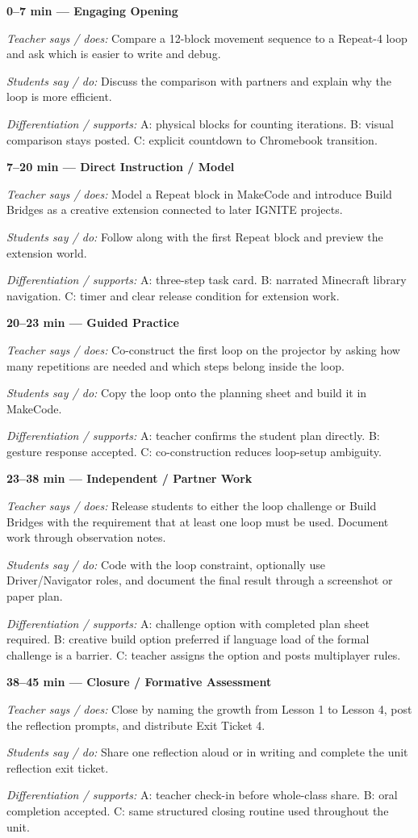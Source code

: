 \documentclass[12pt]{article}
\newcommand{\lessonphase}[5]{%
\noindent\textbf{\color{brickRed}#1 --- #2}\par
\textit{Teacher says / does:} #3\par
\textit{Students say / do:} #4\par
\textit{Differentiation / supports:} #5\par\medskip
}
\begin{document}
\begin{designbox}
\vspace{-0.2cm}
\lessonphase{0--7 min}{Engaging Opening}
{Compare a 12-block movement sequence to a Repeat-4 loop and ask which is easier to write and debug.}
{Discuss the comparison with partners and explain why the loop is more efficient.}
{A: physical blocks for counting iterations. B: visual comparison stays posted. C: explicit countdown to Chromebook transition.}

\vspace{-0.2cm}
\lessonphase{7--20 min}{Direct Instruction / Model}
{Model a Repeat block in MakeCode and introduce Build Bridges as a creative extension connected to later IGNITE projects.}
{Follow along with the first Repeat block and preview the extension world.}
{A: three-step task card. B: narrated Minecraft library navigation. C: timer and clear release condition for extension work.}

\vspace{-0.2cm}
\lessonphase{20--23 min}{Guided Practice}
{Co-construct the first loop on the projector by asking how many repetitions are needed and which steps belong inside the loop.}
{Copy the loop onto the planning sheet and build it in MakeCode.}
{A: teacher confirms the student plan directly. B: gesture response accepted. C: co-construction reduces loop-setup ambiguity.}

\vspace{-0.2cm}
\lessonphase{23--38 min}{Independent / Partner Work}
{Release students to either the loop challenge or Build Bridges with the requirement that at least one loop must be used. Document work through observation notes.}
{Code with the loop constraint, optionally use Driver/Navigator roles, and document the final result through a screenshot or paper plan.}
{A: challenge option with completed plan sheet required. B: creative build option preferred if language load of the formal challenge is a barrier. C: teacher assigns the option and posts multiplayer rules.}

\vspace{-0.2cm}
\lessonphase{38--45 min}{Closure / Formative Assessment}
{Close by naming the growth from Lesson 1 to Lesson 4, post the reflection prompts, and distribute Exit Ticket 4.}
{Share one reflection aloud or in writing and complete the unit reflection exit ticket.}
{A: teacher check-in before whole-class share. B: oral completion accepted. C: same structured closing routine used throughout the unit.}
\end{designbox}
\end{document}
